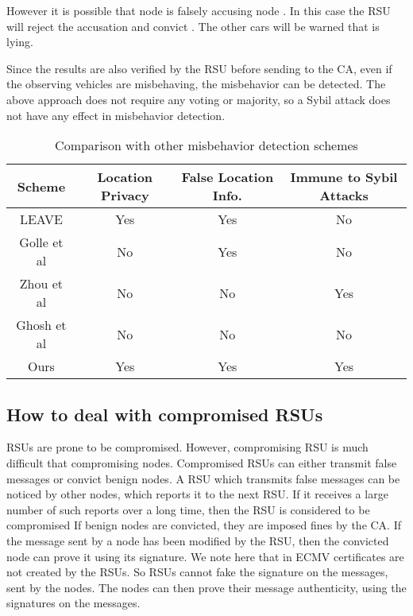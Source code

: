 \documentclass[conference]{IEEEtran}[10pt]
\begin{document}
However it is possible that node  is falsely accusing node . 
In this case the RSU will reject the accusation and convict . 
The other cars will be warned that  is lying. 

Since the results are also verified by the RSU before sending to the CA, even if the observing vehicles are misbehaving, the 
misbehavior can be detected. 
The above approach does not require any voting or majority, so a Sybil attack does not have any effect in 
misbehavior detection. 

\begin{table*}
\begin{center}
{\normalsize
\begin{tabular}{|c|c|c|c|}
\hline
Scheme & Location Privacy & False Location Info. & Immune to Sybil Attacks\\
\hline
LEAVE \cite{RPAJH07} & Yes & Yes & No \\
Golle et al \cite{GGS04} & No & Yes & No\\
Zhou et al \cite{ZCNC07} & No & No & Yes\\
Ghosh et al \cite{GVGKM10} & No & No & No \\
Ours & Yes & Yes & Yes\\
\hline
\end{tabular}
}
\end{center}
\caption{Comparison with other misbehavior detection schemes}
\label{table:other_MDS}
\end{table*}

\subsection{How to deal with compromised RSUs}
RSUs are prone to be compromised.
However, compromising RSU is much difficult that compromising nodes.  
Compromised RSUs can either transmit false messages or convict benign nodes.
A RSU which transmits false messages can be noticed by other nodes, which reports it to the next RSU. 
If it receives a large number  of such reports over a long time, then the RSU is considered to be compromised
If benign nodes are convicted, they are imposed fines by the CA. 
If the message sent by a node has been modified by the RSU, then  the convicted node can prove it using its signature. 
We note here that in ECMV certificates are not created by the RSUs. So RSUs cannot fake the signature on the messages, sent by the nodes.
The nodes can then prove their message authenticity, using the signatures on the messages. 
\end{document}
